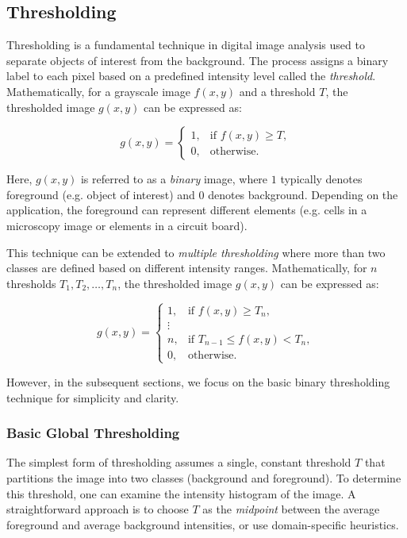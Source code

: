 \documentclass[a4paper,12pt]{article}
\begin{document}
\subsection{Thresholding}

Thresholding is a fundamental technique in digital image analysis used to separate objects of interest from the background. The process assigns a binary label to each pixel based on a predefined intensity level called the \emph{threshold}. Mathematically, for a grayscale image \(f(x, y)\) and a threshold \(T\), the thresholded image \(g(x, y)\) can be expressed as:

\[
g(x, y) = 
\begin{cases}
1, & \text{if } f(x, y) \geq T, \\
0, & \text{otherwise}.
\end{cases}
\]

Here, \(g(x, y)\) is referred to as a \emph{binary} image, where \(1\) typically denotes foreground (e.g. object of interest) and \(0\) denotes background. Depending on the application, the foreground can represent different elements (e.g. cells in a microscopy image or elements in a circuit board).

This technique can be extended to \emph{multiple thresholding} where more than two classes are defined based on different intensity ranges. Mathematically, for \(n\) thresholds \(T_1, T_2, \ldots, T_n\), the thresholded image \(g(x, y)\) can be expressed as:

\[
g(x, y) =
\begin{cases}
1, & \text{if } f(x, y) \geq T_n, \\
\vdots & \\
n, & \text{if } T_{n-1} \leq f(x, y) < T_n, \\
0, & \text{otherwise}.
\end{cases}
\]

However, in the subsequent sections, we focus on the basic binary thresholding technique for simplicity and clarity.

\subsubsection{Basic Global Thresholding}

The simplest form of thresholding assumes a single, constant threshold \(T\) that partitions the image into two classes (background and foreground). To determine this threshold, one can examine the intensity histogram of the image. A straightforward approach is to choose \(T\) as the \emph{midpoint} between the average foreground and average background intensities, or use domain-specific heuristics.
\end{document}
